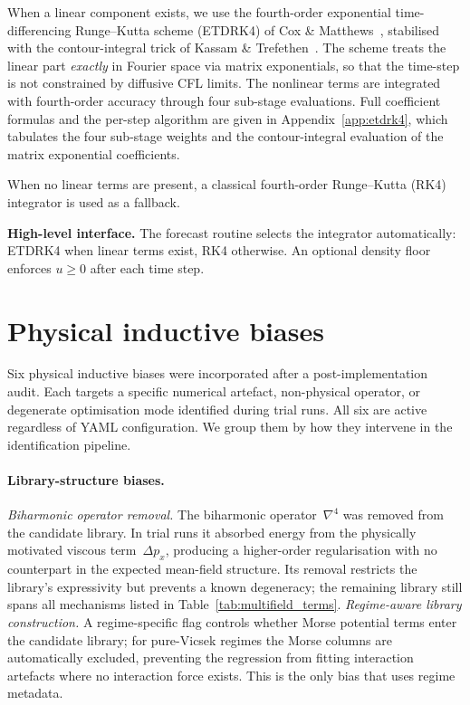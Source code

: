 When a linear component exists, we use the fourth-order exponential
time-differencing Runge--Kutta scheme (ETDRK4) of Cox \&
Matthews~\cite{cox2002etdrk}, stabilised with the contour-integral trick
of Kassam \& Trefethen~\cite{kassam2005etdrk4}.  The scheme treats the
linear part \emph{exactly} in Fourier space via matrix exponentials, so
that the time-step is not constrained by diffusive CFL limits.  The
nonlinear terms are integrated with fourth-order accuracy through four
sub-stage evaluations.  Full coefficient formulas and the per-step
algorithm are given in Appendix~\ref{app:etdrk4}, which tabulates the
four sub-stage weights and the contour-integral evaluation of the matrix
exponential coefficients.

When no linear terms are present, a classical fourth-order Runge--Kutta
(RK4) integrator is used as a fallback.

\noindent\textbf{High-level interface.}
The forecast routine
selects the integrator automatically: ETDRK4 when
linear terms exist, RK4 otherwise.  An optional density floor
enforces $u\ge 0$ after each time step.

\section{Physical inductive biases}
\label{sec:pipeline_fixes}

Six physical inductive biases were incorporated after a
post-implementation audit.  Each targets a specific numerical artefact,
non-physical operator, or degenerate optimisation mode identified during
trial runs.  All six are active regardless of YAML configuration.
We group them by how they intervene in the identification pipeline.

\paragraph{Library-structure biases.}
\emph{Biharmonic operator removal.}
The biharmonic operator~$\nabla^4$ was removed from the candidate library.
In trial runs it absorbed energy from the physically motivated viscous
term~$\Delta p_x$, producing a higher-order regularisation with no
counterpart in the expected mean-field structure.  Its removal restricts
the library's expressivity but prevents a known degeneracy; the remaining
library still spans all mechanisms listed in Table~\ref{tab:multifield_terms}.
\emph{Regime-aware library construction.}
A regime-specific flag controls whether Morse potential terms enter
the candidate library; for pure-Vicsek regimes the Morse columns are
automatically excluded, preventing the regression from fitting interaction
artefacts where no interaction force exists.  This is the only bias that
uses regime metadata.

